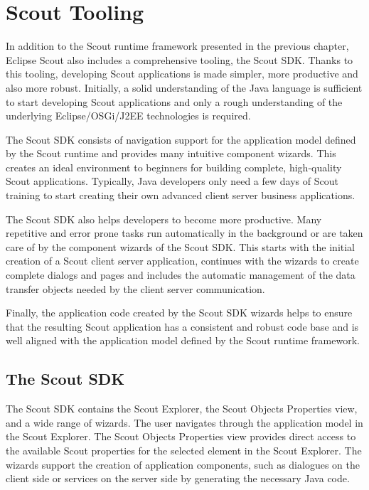 \documentclass[a4paper,10pt,twoside]{book}
\begin{document}
  \sloppy
\fi

\chapter{Scout Tooling}

In addition to the Scout runtime framework presented in the previous chapter, Eclipse Scout also includes a comprehensive tooling, the Scout SDK. 
Thanks to this tooling, developing Scout applications is made simpler, more productive and also more robust. 
Initially, a solid understanding of the Java language is sufficient to start developing Scout applications and only a rough understanding of the underlying Eclipse/OSGi/J2EE technologies is required. 

The Scout SDK consists of navigation support for the application model defined by the Scout runtime and provides many intuitive component wizards. 
This creates an ideal environment to beginners for building complete, high-quality Scout applications. 
Typically, Java developers only need a few days of Scout training to start creating their own advanced client server business applications. 

The Scout SDK also helps developers to become more productive.
Many repetitive and error prone tasks run automatically in the background or are taken care of by the component wizards of the Scout SDK. 
This starts with the initial creation of a Scout client server application, continues with the wizards to create complete dialogs and pages and includes the automatic management of the data transfer objects needed by the client server communication.

Finally, the application code created by the Scout SDK wizards helps to ensure that the resulting Scout application has a consistent and robust code base and is well aligned with the application model defined by the Scout runtime framework.

\section{The Scout SDK}

The Scout SDK contains the Scout Explorer, the Scout Objects Properties view, and a wide range of wizards. The
user navigates through the application model in the Scout
Explorer. The Scout Objects Properties view provides direct access to the available Scout properties for the selected element in the Scout Explorer. 
The wizards support the creation of application components, such as dialogues
on the client side or services on the server side by generating the necessary Java code.
\end{document}
